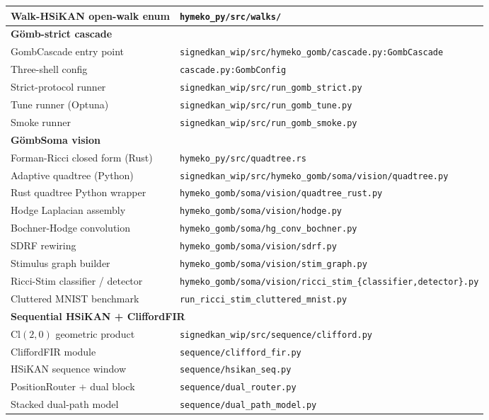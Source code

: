 \documentclass[11pt,a4paper]{article}
\theoremstyle{remark}
\newcommand{\GS}{G\"omb}
\newcommand{\Cl}[2]{\mathrm{Cl}(#1, #2)}
\begin{document}
\begin{center}
\begin{tabular}{p{6cm}p{8cm}}
Walk-HSiKAN open-walk enum & \texttt{hymeko\_py/src/walks/} \\
\midrule
\multicolumn{2}{l}{\textbf{\GS{}-strict cascade}} \\
GombCascade entry point & \texttt{signedkan\_wip/src/hymeko\_gomb/cascade.py:GombCascade} \\
Three-shell config & \texttt{cascade.py:GombConfig} \\
Strict-protocol runner & \texttt{signedkan\_wip/src/run\_gomb\_strict.py} \\
Tune runner (Optuna) & \texttt{signedkan\_wip/src/run\_gomb\_tune.py} \\
Smoke runner & \texttt{signedkan\_wip/src/run\_gomb\_smoke.py} \\
\midrule
\multicolumn{2}{l}{\textbf{\GS{}Soma vision}} \\
Forman-Ricci closed form (Rust) & \texttt{hymeko\_py/src/quadtree.rs} \\
Adaptive quadtree (Python) & \texttt{signedkan\_wip/src/hymeko\_gomb/soma/vision/quadtree.py} \\
Rust quadtree Python wrapper & \texttt{hymeko\_gomb/soma/vision/quadtree\_rust.py} \\
Hodge Laplacian assembly & \texttt{hymeko\_gomb/soma/vision/hodge.py} \\
Bochner-Hodge convolution & \texttt{hymeko\_gomb/soma/hg\_conv\_bochner.py} \\
SDRF rewiring & \texttt{hymeko\_gomb/soma/vision/sdrf.py} \\
Stimulus graph builder & \texttt{hymeko\_gomb/soma/vision/stim\_graph.py} \\
Ricci-Stim classifier / detector & \texttt{hymeko\_gomb/soma/vision/ricci\_stim\_\{classifier,detector\}.py} \\
Cluttered MNIST benchmark & \texttt{run\_ricci\_stim\_cluttered\_mnist.py} \\
\midrule
\multicolumn{2}{l}{\textbf{Sequential HSiKAN + CliffordFIR}} \\
$\Cl{2}{0}$ geometric product & \texttt{signedkan\_wip/src/sequence/clifford.py} \\
CliffordFIR module & \texttt{sequence/clifford\_fir.py} \\
HSiKAN sequence window & \texttt{sequence/hsikan\_seq.py} \\
PositionRouter + dual block & \texttt{sequence/dual\_router.py} \\
Stacked dual-path model & \texttt{sequence/dual\_path\_model.py} \\

\end{tabular}
\end{center}
\end{document}
